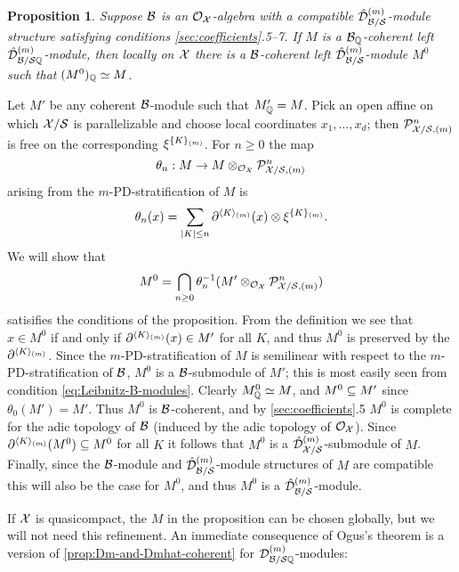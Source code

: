 \documentclass{article}
\theoremstyle{change}
\newtheorem{prop}[subsubsection]{Proposition}
\numberwithin{equation}{subsubsection}
\newcommand{\demobox}{\vrule height6pt width6pt depth0pt}
\newenvironment{demo}{\noindent{\it Proof.}}
{{\unskip\nobreak\hfil\qquad
\demobox\parfillskip=0pt\par}
\medskip}
\begin{document}
\begin{prop}\label{prop:Ogus-integrality-thm}
  Suppose ${\cal B}$ is an ${\cal O}_{\cal X}$-algebra with a compatible
  ${\hat{\cal D}}^{({m})}_{{\cal B}/{\cal S}}$-module structure satisfying conditions
  \ref{sec:coefficients}.5--7. If $M$ is a ${\cal B}_{\mathbb Q}$-coherent left
  ${\hat{\cal D}}^{({m})}_{{\cal B}/{\cal S}{\mathbb Q}}$-module, then locally on ${\cal X}$ there is a
  ${\cal B}$-coherent left ${\hat{\cal D}}^{({m})}_{{\cal B}/{\cal S}}$-module $M^0$ such that
  $(M^0)_{\mathbb Q}\simeq M$.
\end{prop}
\begin{demo}
  Let $M'$ be any coherent ${\cal B}$-module such that $M'_{\mathbb Q}=M$.  Pick
  an open affine on which ${\cal X}/{\cal S}$ is parallelizable and choose local
  coordinates $x_1,\ldots,x_d$; then ${\cal P}^n_{{\cal X}/{\cal S},(m)}$ is free on
  the corresponding ${\xi}^{\{{K}\}_{(m)}}$. For $n\ge0$ the map
  \begin{displaymath}
    \theta_n:M\to M\otimes_{{\cal O}_{\cal X}}{\cal P}^n_{{\cal X}/{\cal S},(m)}
  \end{displaymath}
  arising from the $m$-PD-stratification of $M$ is
  \begin{displaymath}
    \theta_n(x)=\sum_{|K|\le n}{{\partial}}^{\langle{K}\rangle_{(m)}}(x)\otimes{\xi}^{\{{K}\}_{(m)}}.
  \end{displaymath}
  We will show that
  \begin{displaymath}
    M^0=\bigcap_{n\ge0}\theta_n^{-1}(M'\otimes_{{\cal O}_{\cal X}}{\cal P}^n_{{\cal X}/{\cal S},(m)})
  \end{displaymath}
  satisifies the conditions of the proposition.  From the definition
  we see that $x\in M^0$ if and only if ${{\partial}}^{\langle{K}\rangle_{(m)}}(x)\in M'$
  for all $K$, and thus $M^0$ is preserved by the
  ${{\partial}}^{\langle{K}\rangle_{(m)}}$. Since the $m$-PD-stratification of $M$ is
  semilinear with respect to the $m$-PD-stratification of ${\cal B}$, $M^0$
  is a ${\cal B}$-submodule of $M'$; this is most easily seen from
  condition \ref{eq:Leibnitz-B-modules}. Clearly $M^0_{\mathbb Q}\simeq M$,
  and $M^0\subseteq M'$ since $\theta_0(M')=M'$. Thus $M^0$ is
  ${\cal B}$-coherent, and by \ref{sec:coefficients}.5 $M^0$ is complete
  for the adic topology of ${\cal B}$ (induced by the adic topology of
  ${\cal O}_{\cal X}$). Since ${{\partial}}^{\langle{K}\rangle_{(m)}}(M^0)\subseteq M^0$ for all $K$ it
  follows that $M^0$ is a ${\hat{\cal D}}^{({m})}_{{\cal X}/{\cal S}}$-submodule of
  $M$. Finally, since the ${\cal B}$-module and
  ${\hat{\cal D}}^{({m})}_{{\cal B}/{\cal S}}$-module structures of $M$ are compatible
  this will also be the case for $M^0$, and thus $M^0$ is a
  ${\hat{\cal D}}^{({m})}_{{\cal B}/{\cal S}}$-module.
\end{demo}

If ${\cal X}$ is quasicompact, the $M$ in the proposition can be chosen
globally, but we will not need this refinement. An immediate
consequence of Ogus's theorem is a version of
\ref{prop:Dm-and-Dmhat-coherent} for
${{\cal D}}^{({m})}_{{\cal B}/{\cal S}{\mathbb Q}}$-modules:
\end{document}

